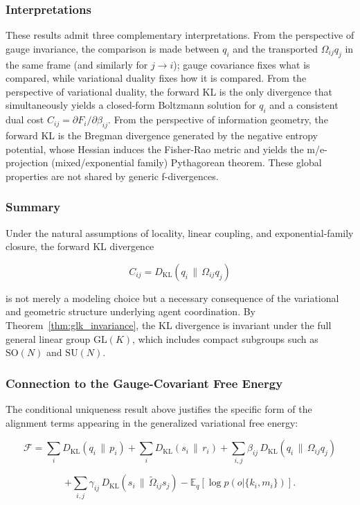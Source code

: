 \documentclass[twoside,11pt]{article}
\begin{document}
\subsubsection{Interpretations}
These results admit three complementary interpretations. From the perspective of gauge invariance, the comparison is made between $q_i$ and the transported $\Omega_{ij}q_j$ in the same frame (and similarly for $j \rightarrow i$); gauge covariance fixes what is compared, while variational duality fixes how it is compared. From the perspective of variational duality, the forward KL is the only divergence that simultaneously yields a closed-form Boltzmann solution for $q_i$ and a consistent dual cost $C_{ij} = \partial F_i / \partial \beta_{ij}$. From the perspective of information geometry, the forward KL is the Bregman divergence generated by the negative entropy potential, whose Hessian induces the Fisher-Rao metric and yields the m/e-projection (mixed/exponential family) Pythagorean theorem. These global properties are not shared by generic f-divergences.

\subsubsection{Summary}
Under the natural assumptions of locality, linear coupling, and exponential-family closure, the forward KL divergence

\[
\boxed{
C_{ij}=D_{\mathrm{KL}}(q_i \,\|\, \Omega_{ij} q_j)}
\]

is not merely a modeling choice but a necessary consequence of the variational and geometric structure underlying agent coordination. By Theorem~\ref{thm:glk_invariance}, the KL divergence is invariant under the full general linear group $\mathrm{GL}(K)$, which includes compact subgroups such as $\mathrm{SO}(N)$ and $\mathrm{SU}(N)$.

\subsubsection{Connection to the Gauge-Covariant Free Energy}
The conditional uniqueness result above justifies the specific form of the alignment terms appearing in the generalized variational free energy:

$$
\mathcal{F}
=\sum_i D_{\mathrm{KL}}(q_i \,\|\, p_i)
+ \sum_i D_{\mathrm{KL}}(s_i \,\|\, r_i)
+ \sum_{i,j}\beta_{ij}\,D_{\mathrm{KL}}(q_i \,\|\, \Omega_{ij} q_j)
$$

$$
+ \sum_{i,j}\gamma_{ij}\,D_{\mathrm{KL}}(s_i \,\|\, \tilde{\Omega}_{ij}s_j)- \mathbb{E}_q[\log p(o|\{k_i,m_i\})].
$$
\end{document}
